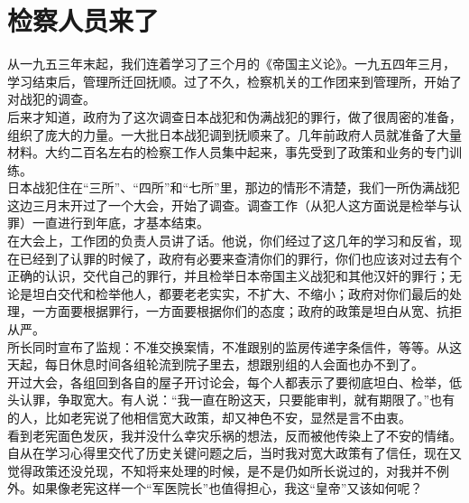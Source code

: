 \fancyhead[RO]{} %
\fancyhead[LE]{} %
\chapter*{检察人员来了}
\thispagestyle{empty}
 从一九五三年末起，我们连着学习了三个月的《帝国主义论》。一九五四年三月，学习结束后，管理所迁回抚顺。过了不久，检察机关的工作团来到管理所，开始了对战犯的调查。\\

后来才知道，政府为了这次调查日本战犯和伪满战犯的罪行，做了很周密的准备，组织了庞大的力量。一大批日本战犯调到抚顺来了。几年前政府人员就准备了大量材料。大约二百名左右的检察工作人员集中起来，事先受到了政策和业务的专门训练。\\

日本战犯住在“三所”、“四所”和“七所”里，那边的情形不清楚，我们一所伪满战犯这边三月末开过了一个大会，开始了调查。调查工作（从犯人这方面说是检举与认罪）一直进行到年底，才基本结束。\\

在大会上，工作团的负责人员讲了话。他说，你们经过了这几年的学习和反省，现在已经到了认罪的时候了，政府有必要来查清你们的罪行，你们也应该对过去有个正确的认识，交代自己的罪行，并且检举日本帝国主义战犯和其他汉奸的罪行；无论是坦白交代和检举他人，都要老老实实，不扩大、不缩小；政府对你们最后的处理，一方面要根据罪行，一方面要根据你们的态度；政府的政策是坦白从宽、抗拒从严。\\

所长同时宣布了监规：不准交换案情，不准跟别的监房传递字条信件，等等。从这天起，每日休息时间各组轮流到院子里去，想跟别组的人会面也办不到了。\\

开过大会，各组回到各自的屋子开讨论会，每个人都表示了要彻底坦白、检举，低头认罪，争取宽大。有人说：“我一直在盼这天，只要能审判，就有期限了。”也有的人，比如老宪说了他相信宽大政策，却又神色不安，显然是言不由衷。\\

看到老宪面色发灰，我并没什么幸灾乐祸的想法，反而被他传染上了不安的情绪。自从在学习心得里交代了历史关键问题之后，当时我对宽大政策有了信任，现在又觉得政策还没兑现，不知将来处理的时候，是不是仍如所长说过的，对我并不例外。如果像老宪这样一个“军医院长”也值得担心，我这“皇帝”又该如何呢？\\

